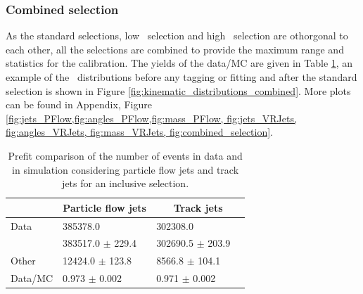 \documentclass[letterpaper,12pt]{article}
\begin{document}
\subsubsection{Combined selection}
\label{combined_selection}
As the standard selections, low \pt\ selection and high \pt\ selection are othorgonal 
to each other, all the selections are combined to provide the maximum range 
and statistics for the calibration. 
The yields of the data/MC are given in Table \ref{tab:yields_combined}, 
an example of the \pt\ distributions before any tagging or fitting and 
after the standard selection is shown in Figure \ref{fig:kinematic_distributions_combined}. More plots 
can be found in Appendix, Figure \ref{fig:jets_PFlow,fig:angles_PFlow,fig:mass_PFlow,
fig:jets_VRJets, fig:angles_VRJets, fig:mass_VRJets, fig:combined_selection}.
\begin{table}[!b]
	\centering
	\small
	\setlength\tabcolsep{5pt} 
	\begin{tabular}{|l | ll | ll |}
	\hline
	& \multicolumn{2}{c|}{Particle flow jets} & \multicolumn{2}{c|}{Track jets} \\
	\hline
	Data          &    385378.0                  &        &   302308.0              &     \\  
	\ttbar\         &    383517.0 $\pm$      229.4 &        &   302690.5 $\pm$      203.9 &   \\
	Other         &     12424.0 $\pm$      123.8 &        &     8566.8 $\pm$      104.1 &   \\
	Data/MC       &    0.973 $\pm$ 0.002         &        &  0.971 $\pm$ 0.002  &           \\
	\hline

	\end{tabular}
	\vspace{0.2cm}
	\caption{Prefit comparison of the number of events in data and in 
	simulation considering particle flow jets and track jets for an inclusive
	selection.}
	\label{tab:yields_combined}
	\end{table}
\end{document}
